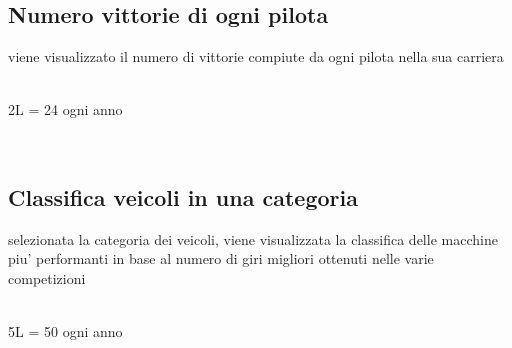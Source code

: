 \documentclass[a4paper,12pt]{report}
\begin{document}
	\subsection{Numero vittorie di ogni pilota}
	viene visualizzato il numero di vittorie compiute da ogni pilota nella sua carriera
	\begin{table}[!htb]
		\centering
		\begin{center}
		\newline\\
		2L = 24 ogni anno\\
		\end{center}
	\end{table}\\
	\subsection{Classifica veicoli in una categoria}
	selezionata la categoria dei veicoli, viene visualizzata la classifica delle macchine piu' performanti in base al numero
	di giri migliori ottenuti nelle varie competizioni
	\begin{table}[!htb]
		\centering
		\begin{center}
		\newline\\
		5L = 50 ogni anno\\
		\end{center}
	\end{table}\\
\end{document}
